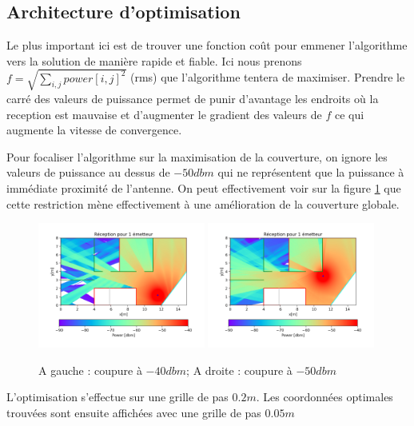 \documentclass[sn-mathphys-num]{sn-jnl}
\begin{document}
\subsection{Architecture d'optimisation}
\label{sub:arch_opti}

Le plus important ici est de trouver une fonction coût pour emmener l'algorithme
vers la solution de manière rapide et fiable.
Ici nous prenons $f = \sqrt{\sum_{i,j}power[i,j]^2}$ (rms) que l'algorithme tentera de maximiser.
Prendre le carré des valeurs de puissance permet de punir d'avantage les endroits où
la reception est mauvaise et d'augmenter le gradient des valeurs de $f$ ce qui 
augmente la vitesse de convergence. 

Pour focaliser l'algorithme sur la maximisation de la couverture,
on ignore les valeurs de puissance au dessus de $-50dbm$ qui ne représentent que la puissance
à immédiate proximité de l'antenne. On peut effectivement voir sur la figure \ref{fig:coupure}
que cette restriction mène effectivement à une amélioration de la couverture globale.

\begin{figure}[H]
    \centering
    \includegraphics[width=0.49\textwidth]{images/optimize/1_dbm_40.png}
    \includegraphics[width=0.49\textwidth]{images/optimize/1_dbm.png}
    \caption{A gauche : coupure à $-40dbm$; A droite : coupure à $-50dbm$}
    \label{fig:coupure}
\end{figure}


L'optimisation s'effectue sur une grille de pas $0.2m$. Les coordonnées optimales
trouvées sont ensuite affichées avec une grille de pas $0.05m$
\end{document}
